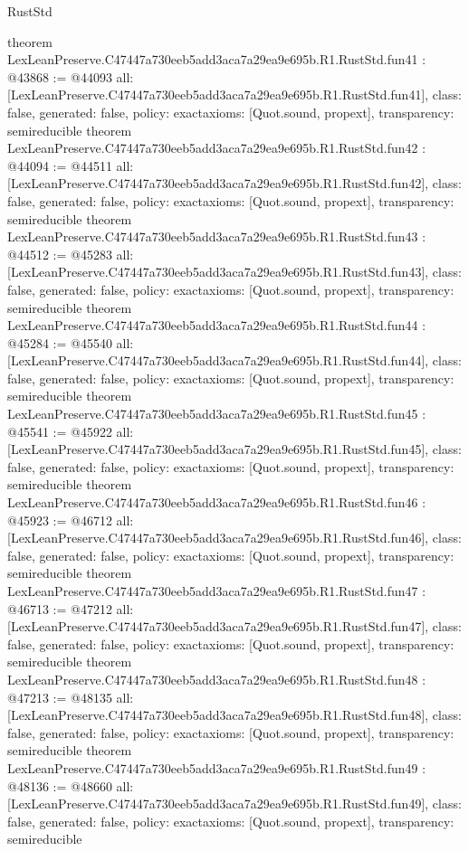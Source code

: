 \begin{lexlean}{RustStd}
\begin{coremodule}
{}
theorem LexLeanPreserve.C47447a730eeb5add3aca7a29ea9e695b.R1.RustStd.fun41 : @43868 := @44093 {
  all: [LexLeanPreserve.C47447a730eeb5add3aca7a29ea9e695b.R1.RustStd.fun41],
  class: false,
  generated: false,
  policy: exact{axioms: [Quot.sound, propext]},
  transparency: semireducible
}
theorem LexLeanPreserve.C47447a730eeb5add3aca7a29ea9e695b.R1.RustStd.fun42 : @44094 := @44511 {
  all: [LexLeanPreserve.C47447a730eeb5add3aca7a29ea9e695b.R1.RustStd.fun42],
  class: false,
  generated: false,
  policy: exact{axioms: [Quot.sound, propext]},
  transparency: semireducible
}
theorem LexLeanPreserve.C47447a730eeb5add3aca7a29ea9e695b.R1.RustStd.fun43 : @44512 := @45283 {
  all: [LexLeanPreserve.C47447a730eeb5add3aca7a29ea9e695b.R1.RustStd.fun43],
  class: false,
  generated: false,
  policy: exact{axioms: [Quot.sound, propext]},
  transparency: semireducible
}
theorem LexLeanPreserve.C47447a730eeb5add3aca7a29ea9e695b.R1.RustStd.fun44 : @45284 := @45540 {
  all: [LexLeanPreserve.C47447a730eeb5add3aca7a29ea9e695b.R1.RustStd.fun44],
  class: false,
  generated: false,
  policy: exact{axioms: [Quot.sound, propext]},
  transparency: semireducible
}
theorem LexLeanPreserve.C47447a730eeb5add3aca7a29ea9e695b.R1.RustStd.fun45 : @45541 := @45922 {
  all: [LexLeanPreserve.C47447a730eeb5add3aca7a29ea9e695b.R1.RustStd.fun45],
  class: false,
  generated: false,
  policy: exact{axioms: [Quot.sound, propext]},
  transparency: semireducible
}
theorem LexLeanPreserve.C47447a730eeb5add3aca7a29ea9e695b.R1.RustStd.fun46 : @45923 := @46712 {
  all: [LexLeanPreserve.C47447a730eeb5add3aca7a29ea9e695b.R1.RustStd.fun46],
  class: false,
  generated: false,
  policy: exact{axioms: [Quot.sound, propext]},
  transparency: semireducible
}
theorem LexLeanPreserve.C47447a730eeb5add3aca7a29ea9e695b.R1.RustStd.fun47 : @46713 := @47212 {
  all: [LexLeanPreserve.C47447a730eeb5add3aca7a29ea9e695b.R1.RustStd.fun47],
  class: false,
  generated: false,
  policy: exact{axioms: [Quot.sound, propext]},
  transparency: semireducible
}
theorem LexLeanPreserve.C47447a730eeb5add3aca7a29ea9e695b.R1.RustStd.fun48 : @47213 := @48135 {
  all: [LexLeanPreserve.C47447a730eeb5add3aca7a29ea9e695b.R1.RustStd.fun48],
  class: false,
  generated: false,
  policy: exact{axioms: [Quot.sound, propext]},
  transparency: semireducible
}
theorem LexLeanPreserve.C47447a730eeb5add3aca7a29ea9e695b.R1.RustStd.fun49 : @48136 := @48660 {
  all: [LexLeanPreserve.C47447a730eeb5add3aca7a29ea9e695b.R1.RustStd.fun49],
  class: false,
  generated: false,
  policy: exact{axioms: [Quot.sound, propext]},
  transparency: semireducible
}
\end{coremodule}
\end{lexlean}
